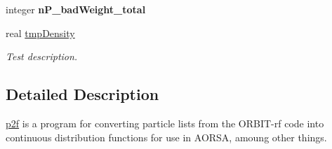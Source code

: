\begin{CompactItemize}
\item 
\hypertarget{namespacep2f_c6b9cc0a91b039da4d7e041948181e3f}{
integer \textbf{nP\_\-badWeight\_\-total}}
\label{namespacep2f_c6b9cc0a91b039da4d7e041948181e3f}

\item 
\hypertarget{namespacep2f_337237fc457d75ecf84107f26c5cd7a0}{
real \hyperlink{namespacep2f_337237fc457d75ecf84107f26c5cd7a0}{tmpDensity}}
\label{namespacep2f_337237fc457d75ecf84107f26c5cd7a0}

\begin{CompactList}\small\item\em Test description. \item\end{CompactList}\end{CompactItemize}


\subsection{Detailed Description}
\hyperlink{namespacep2f}{p2f} is a program for converting particle lists from the ORBIT-rf code into continuous distribution functions for use in AORSA, amoung other things. 

